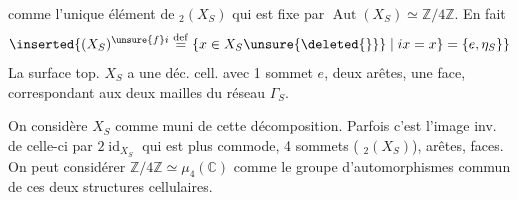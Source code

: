 
comme l'unique élément de \({}_2(X_S)\) qui
est fixe par $\operatorname{Aut}(X_S)\simeq\mathbb Z/4\mathbb Z$. En fait
\[
\inserted{(X_S)^{\unsure{f}i}\overset{\mathrm{def}}{=}\{x\in X_S\unsure{\deleted{\}}}\mid ix=x\}=\{e,\eta_S\}}
\]
 La surface top. $X_S$ a une déc. cell.
 avec 1 sommet $e$, deux arêtes, une face,
 correspondant aux deux mailles du réseau $\Gamma_S$.

On considère $X_S$ comme muni de cette décomposition.
Parfois c'est l'image inv. de celle-ci par $2\operatorname{id}_{X_S}$
qui est plus commode, 4 sommets ( \({}_2(X_S)\)),
  arêtes,
  faces.
On peut considérer $\mathbb Z/4\mathbb Z\simeq\mu_4(\mathbb C)$
comme le groupe d'automorphismes commun de ces deux structures cellulaires.

